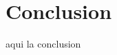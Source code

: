 \documentclass[preprint,12pt]{elsarticle}
\begin{document}
	

	


	
	
\section{Conclusion}
aqui la conclusion

	
	

	
	
	\newpage
	
	
	
	
	
	
	
	
	
	
	
	
	
	
\end{document}
